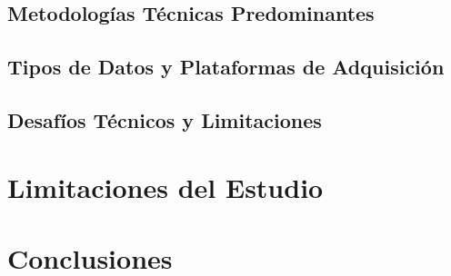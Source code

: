 \documentclass[12pt,a4paper]{article}
\begin{document}
\subsection{Metodologías Técnicas Predominantes}

\subsection{Tipos de Datos y Plataformas de Adquisición}

\subsection{Desafíos Técnicos y Limitaciones}

\section{Limitaciones del Estudio}

\section{Conclusiones}




\end{document}
